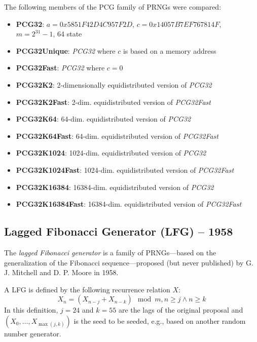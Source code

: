     The following members of the PCG family of PRNGs were compared:
    \begin{itemize}
		\itemsep0em
        \item \textbf{PCG32}:           $a = 0x5851F42D4C957F2D$, $c = 0x14057B7EF767814F$, $m = 2^{31} - 1$, \SI{64}{\bit} state
        \item \textbf{PCG32Unique}:     \textit{PCG32} where $c$ is based on a memory address
        \item \textbf{PCG32Fast}:       \textit{PCG32} where $c = 0$
        \item \textbf{PCG32K2}:         2-dimensionally equidistributed version of \textit{PCG32}
        \item \textbf{PCG32K2Fast}:     2-dim. equidistributed version of \textit{PCG32Fast}
        \item \textbf{PCG32K64}:        64-dim. equidistributed version of \textit{PCG32}
        \item \textbf{PCG32K64Fast}:    64-dim. equidistributed version of \textit{PCG32Fast}
        \item \textbf{PCG32K1024}:      1024-dim. equidistributed version of \textit{PCG32}
        \item \textbf{PCG32K1024Fast}:  1024-dim. equidistributed version of \textit{PCG32Fast}
        \item \textbf{PCG32K16384}:     16384-dim. equidistributed version of \textit{PCG32}
        \item \textbf{PCG32K16384Fast}: 16384-dim. equidistributed version of \textit{PCG32Fast}
    \end{itemize}

\subsection[Lagged Fibonacci Generator (LFG) -- 1958]{Lagged Fibonacci Generator (LFG) -- 1958} \label{subsec:lfg}

    The \emph{lagged Fibonacci generator} is a family of PRNGs---based on the generalization of the Fibonacci sequence---proposed (but never published) by G. J. Mitchell and D. P. Moore in 1958.

    A LFG is defined by the following recurrence relation $X$:
    \begin{equation*}
        X_n = \left(X_{n - j} + X_{n - k}\right) \mod m, n \geq j \land n \geq k
    \end{equation*}
    In this definition, $j = 24$ and $k = 55$ are the lags of the original proposal and $\left(X_0, ..., X_{\max\left(j, k\right)}\right)$ is the seed to be seeded, e.g., based on another random number generator.

